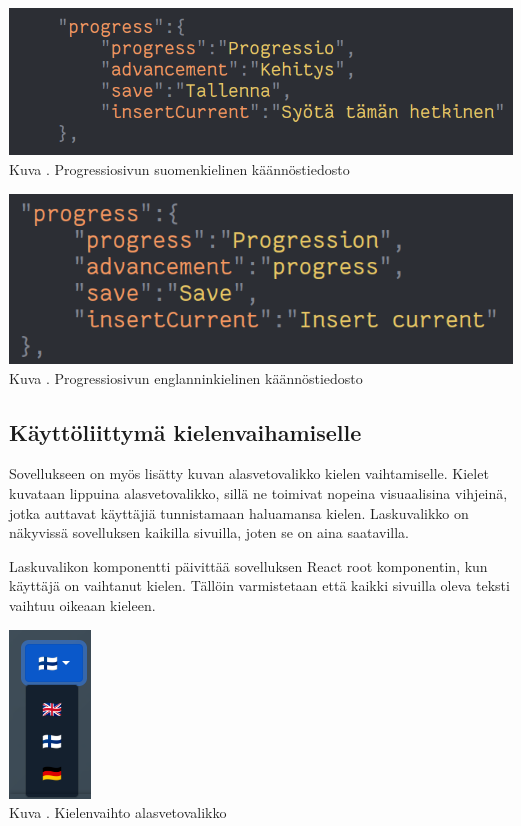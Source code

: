 \documentclass[11pt,a4paper,titlepage,oneside]{article}
\begin{document}
\bigskip
\includegraphics[width = 15cm]{src/public/oppar/translationfile.png}\\
Kuva \getImgCount. {} Progressiosivun suomenkielinen käännöstiedosto 
\medskip


\bigskip
\includegraphics[width = 15cm]{src/public/oppar/translationfileEng.png}\\
Kuva \getImgCount {}. Progressiosivun englanninkielinen käännöstiedosto
\medskip




\subsection{Käyttöliittymä kielenvaihamiselle}


Sovellukseen on myös lisätty kuvan \nextImageCount{} alasvetovalikko kielen vaihtamiselle. 
Kielet kuvataan lippuina alasvetovalikko,
sillä ne toimivat nopeina visuaalisina vihjeinä, jotka auttavat käyttäjiä tunnistamaan haluamansa kielen.
Laskuvalikko on näkyvissä sovelluksen kaikilla sivuilla, joten se on aina saatavilla.
\medskip



Laskuvalikon komponentti päivittää sovelluksen React root komponentin, kun käyttäjä on vaihtanut kielen.
Tällöin varmistetaan että kaikki sivuilla oleva teksti vaihtuu oikeaan kieleen.
\medskip


\bigskip
\includegraphics[]{src/public/locale_laskuvalikko.png}\\
Kuva \getImgCount {}. Kielenvaihto alasvetovalikko
\end{document}
